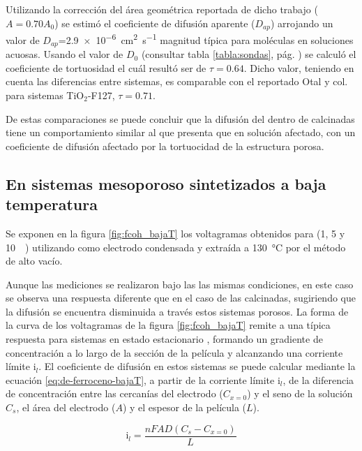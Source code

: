 	 Utilizando la corrección del área geométrica reportada de dicho trabajo ($A\!=\!0.70A_0$) se estimó el coeficiente de difusión aparente ($D_{ap}$) arrojando un valor de $D_{ap}$=\SI{2,9e-6}{\square\cm\per\second} magnitud típica para moléculas en soluciones acuosas.\cite{koryta1993,Otal2006,longinotti2007} Usando el valor de $D_0$ (consultar tabla \ref{tabla:sondas}, pág. \pageref{tabla:sondas}) se calculó el coeficiente de tortuosidad el cuál resultó ser de $\tau=0.64$. Dicho valor, teniendo en cuenta las diferencias entre sistemas, es comparable con el reportado Otal y col. para sistemas TiO$_2$-F127, $\tau=0.71$.

	  De estas comparaciones se puede concluir que la difusión del \fc\space dentro de \pdmF\space calcinadas tiene un comportamiento similar al que presenta que en solución afectado, con un coeficiente de difusión afectado por la tortuocidad de la estructura porosa.
  	
	\subsection{En sistemas mesoporoso sintetizados a baja temperatura}

		Se exponen en la figura \ref{fig:fcoh_bajaT} los voltagramas obtenidos para \fc\space (1, 5 y \SI{10}{\milli\Molar}) utilizando como electrodo \pdmF\space condensada y extraída a \SI{130}{\celsius} por el método de alto vacío. 
			
		Aunque las mediciones se realizaron bajo las las mismas condiciones, en este caso se observa una respuesta diferente que en el caso de las \pdmF\space calcinadas, sugiriendo que la difusión se encuentra disminuida a través estos sistemas porosos. La forma de la curva de los voltagramas de la figura \ref{fig:fcoh_bajaT} remite a una típica respuesta para sistemas en estado estacionario	, formando un gradiente de concentración a lo largo de la sección de la película y alcanzando una corriente límite $\text{i}_l$. 
		El coeficiente de difusión en estos sistemas se puede calcular mediante la ecuación \ref{eq:de-ferroceno-bajaT}, a partir de la corriente límite $\text{i}_l$, de la diferencia de concentración entre las cercanías del electrodo ($C_{x=0}$) y el seno de la solución $C_s$, el área del electrodo ($A$) y el espesor de la película ($L$).

			\begin{equation}
					\text{i}_l = \frac{nFAD(C_{s}-C_{x=0})}{L}
					\label{eq:de-ferroceno-bajaT}
			\end{equation}
			  	

